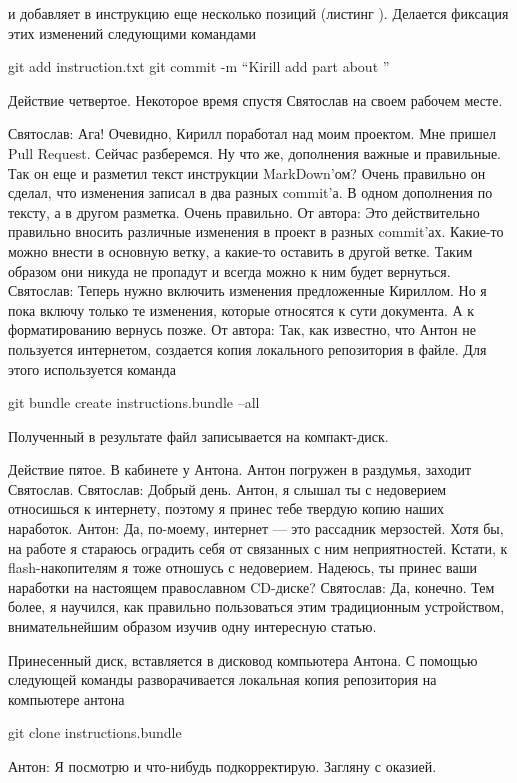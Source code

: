 и добавляет в инструкцию еще несколько позиций (листинг ).
Делается фиксация этих изменений следующими командами

git add instruction.txt
git commit -m ``Kirill add part about ''



Действие четвертое.
Некоторое время спустя Святослав на своем рабочем месте.

Святослав: Ага! Очевидно, Кирилл поработал над моим проектом. Мне пришел  Pull Request.
Сейчас разберемся. Ну что же, дополнения важные и правильные. Так он еще и разметил текст
инструкции MarkDown'ом? Очень правильно он сделал, что изменения записал в два разных commit'а.
В одном дополнения по тексту, а в другом разметка. Очень правильно.
От автора: Это действительно правильно вносить различные изменения в проект в разных commit'ах.
Какие-то можно внести в основную ветку, а какие-то оставить в другой ветке. Таким образом они
никуда не пропадут и всегда можно к ним будет вернуться. 
Святослав: Теперь нужно включить изменения предложенные Кириллом. Но я пока включу только те 
изменения, которые относятся к сути документа. А к форматированию вернусь позже.
От автора:
Так, как известно, что Антон не пользуется интернетом, создается копия локального 
репозитория в файле. Для этого используется команда

git bundle create instructions.bundle --all

Полученный в результате файл записывается на компакт-диск.

Действие пятое. 
В кабинете у Антона. Антон погружен в раздумья, заходит Святослав.
Святослав: Добрый день. Антон, я слышал ты с недоверием относишься к интернету, поэтому я принес
тебе твердую копию наших наработок. 
Антон: Да, по-моему, интернет --- это рассадник мерзостей. Хотя бы, на работе я стараюсь оградить себя от 
связанных с ним неприятностей. Кстати, к flash-накопителям я тоже отношусь с недоверием. Надеюсь, 
ты принес ваши наработки на настоящем православном CD-диске? 
Святослав: Да, конечно. Тем более, я научился, как правильно пользоваться
этим традиционным устройством, внимательнейшим образом изучив одну интересную статью.

Принесенный диск, вставляется в дисковод компьютера Антона. С помощью следующей команды разворачивается
локальная копия репозитория на компьютере антона

git clone instructions.bundle

Антон: Я посмотрю и что-нибудь подкорректирую. Загляну с оказией.
